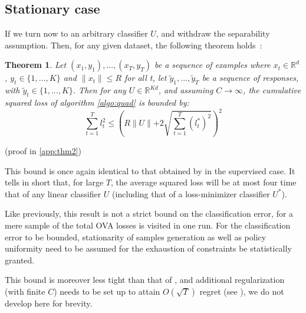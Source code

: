 \documentclass[preprint,12pt,authoryear]{elsarticle}
\newtheorem{theorem}{Theorem}
\begin{document}
\subsection{Stationary case}
If we turn now to an arbitrary classifier $U$, and withdraw the separability assumption. Then, for any given dataset, the following theorem holds~:

\begin{theorem}
	\label{theo:BPAT2}
	Let $(x_1,y_1),...,(x_T,y_T)$ be a sequence of examples where $x_t \in \mathbb{R}^d$, $y_t\in \{1,...,K\}$ and $\parallel x_t \parallel\leqslant R$ for all t, let $\tilde{y}_1,...,\tilde{y}_T$ be a sequence of responses, with $\tilde{y}_t\in \{1,...,K\}$. Then for any  $U \in \mathbb{R}^{K d}$, and assuming $C \rightarrow \infty$, the cumulative squared loss of algorithm \ref{algo:quad} is bounded by:
	\[\sum_{t=1}^{T}l_t^2 \leqslant \left(R\parallel{U}\parallel+2 \sqrt{\sum_{t=1}^{T}(l_t^{\ast})^2}\right)^2 \]
\end{theorem}

(proof in \ref{app:thm2})

This bound is once again identical to that obtained by 
\cite{crammer2006online} in the supervised case. 
It tells in short that, for large $T$, the average squared 
loss will be at most four time that of any linear 
classifier $U$ (including that of a loss-minimizer classifier $U^*$). 

Like previously, this result is not a strict bound on the classification error, for a mere sample of the total OVA losses is visited in one run. For the classification error to be bounded, stationarity of samples generation as well as policy uniformity need to be assumed for the exhaustion of constraints be statistically granted.  

This bound is moreover less tight than that of \cite{freund1997decision}, and  additional regularization (with finite $C$) needs to be set up to attain $O(\sqrt{T})$ regret (see \cite{crammer2006online}),  
we do not develop here for brevity. 


\end{document}
